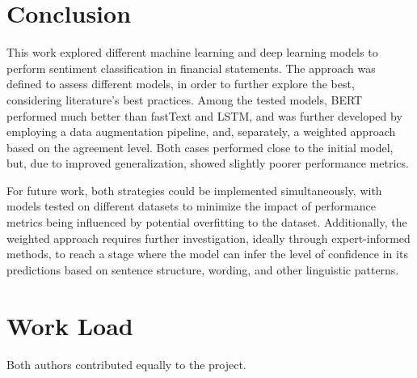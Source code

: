 \documentclass[conference]{IEEEtran}
\begin{document}
\section{Conclusion}

This work explored different machine learning and deep learning models to perform sentiment classification in financial statements. The approach was defined to assess different models, in order to further explore the best, considering literature's best practices. Among the tested models, BERT performed much better than fastText and LSTM, and was further developed by employing a data augmentation pipeline, and, separately, a weighted approach based on the agreement level. Both cases performed close to the initial model, but, due to improved generalization, showed slightly poorer performance metrics.

For future work, both strategies could be implemented simultaneously, with models tested on different datasets to minimize the impact of performance metrics being influenced by potential overfitting to the dataset. Additionally, the weighted approach requires further investigation, ideally through expert-informed methods, to reach a stage where the model can infer the level of confidence in its predictions based on sentence structure, wording, and other linguistic patterns.

\section*{Work Load}

Both authors contributed equally to the project.



\end{document}
